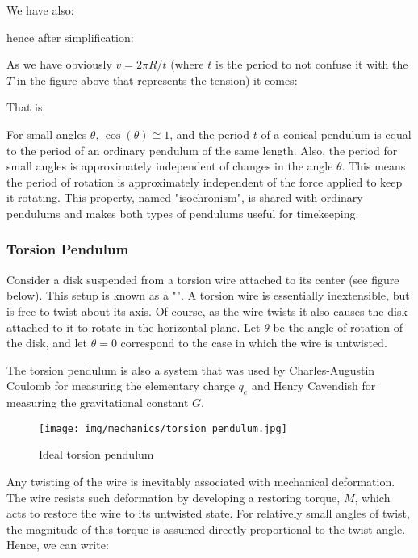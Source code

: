 	We have also:
	
	hence after simplification:
	
	As we have obviously $v=2\pi R/t$ (where $t$ is the period to not confuse it with the $T$ in the figure above that represents the tension) it comes:
	
	That is:
	
	For small angles $\theta$, $\cos(\theta)\cong 1$, and the period $t$ of a conical pendulum is equal to the period of an ordinary pendulum of the same length. Also, the period for small angles is approximately independent of changes in the angle $\theta$. This means the period of rotation is approximately independent of the force applied to keep it rotating. This property, named "isochronism", is shared with ordinary pendulums and makes both types of pendulums useful for timekeeping.	
	
	\pagebreak
	\subsubsection{Torsion Pendulum}
	Consider a disk suspended from a torsion wire attached to its center (see figure below). This setup is known as a "". A torsion wire is essentially inextensible, but is free to twist about its axis. Of course, as the wire twists it also causes the disk attached to it to rotate in the horizontal plane. Let $\theta$ be the angle of rotation of the disk, and let $\theta=0$ correspond to the case in which the wire is untwisted.
	
	\begin{tcolorbox}[title=Remark,colframe=black,arc=10pt]
	The torsion pendulum is also a system that was used by Charles-Augustin Coulomb for measuring the elementary charge $q_e$ and Henry Cavendish for measuring the gravitational constant $G$.
	\end{tcolorbox}
	
	\begin{figure}[H]
		\centering
		\texttt{[image: img/mechanics/torsion\_pendulum.jpg]}
		\caption{Ideal torsion pendulum}
	\end{figure}
	Any twisting of the wire is inevitably associated with mechanical deformation. The wire resists such deformation by developing a restoring torque, $M$, which acts to restore the wire to its untwisted state. For relatively small angles of twist, the magnitude of this torque is assumed directly proportional to the twist angle. Hence, we can write:
	
